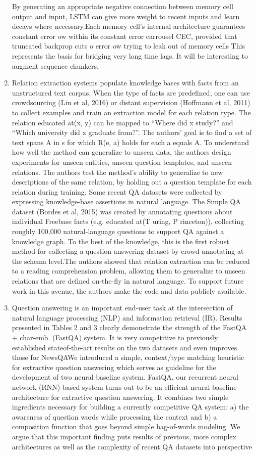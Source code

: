 \documentclass[11pt]{article}
\begin{document}
\begin{enumerate}
    By generating an appropriate negative connection between memory cell output and input, LSTM can give more weight to recent inputs and learn decays where necessary.Each memory cell's internal architecture guarantees constant error ow within its constant error carrousel CEC, provided that truncated backprop cuts o error ow trying to leak out of memory cells
    This represents the basis for bridging very long time lags.
    It will be interesting to augment sequence chunkers. \cite{schmid}
    \item  Relation extraction systems populate knowledge bases with facts from an unstructured text corpus.
    When the type of facts are predefined, one can use crowdsourcing (Liu et al, 2016) or distant supervision (Hoffmann et al, 2011) to collect examples and train an extraction model for each relation type.
    The relation educated at(x, y) can be mapped to “Where did x study?” and “Which university did x graduate from?”. The authors' goal is to find a set of text spans A in s for which R(e, a) holds for each a equals A. To understand how well the method can generalize to unseen data, the authors design experiments for unseen entities, unseen question templates, and unseen relations. The authors test the method’s ability to generalize to new descriptions of the same relation, by holding out a question template for each relation during training. Some recent QA datasets were collected by expressing knowledge-base assertions in natural language.
    The Simple QA dataset (Bordes et al, 2015) was created by annotating questions about individual Freebase facts (e.g. educated at(T uring, P rinceton)), collecting roughly 100,000 natural-language questions to support QA against a knowledge graph.
    To the best of the knowledge, this is the first robust method for collecting a question-answering dataset by crowd-annotating at the schema level.The authors showed that relation extraction can be reduced to a reading comprehension problem, allowing them to generalize to unseen relations that are defined on-the-fly in natural language.
    To support future work in this avenue, the authors make the code and data publicly available.\cite{levy}
    \item Question answering is an important end-user task at the intersection of natural language processing (NLP) and information retrieval (IR). Results presented in Tables 2 and 3 clearly demonstrate the strength of the FastQA + char-emb. (FastQA) system. It is very competitive to previously established stateof-the-art results on the two datasets and even improves those for NewsQAWe introduced a simple, context/type matching heuristic for extractive question answering which serves as guideline for the development of two neural baseline system. FastQA, our recurrent neural network (RNN)-based system turns out to be an efficient neural baseline architecture for extractive question answering. It combines two simple ingredients necessary for building a currently competitive QA system: a) the awareness of question words while processing the context and b) a composition function that goes beyond simple bag-of-words modeling. We argue that this important finding puts results of previous, more complex architectures as well as the complexity of recent QA datasets into perspective\cite{wiese}

\end{enumerate}
\end{document}
